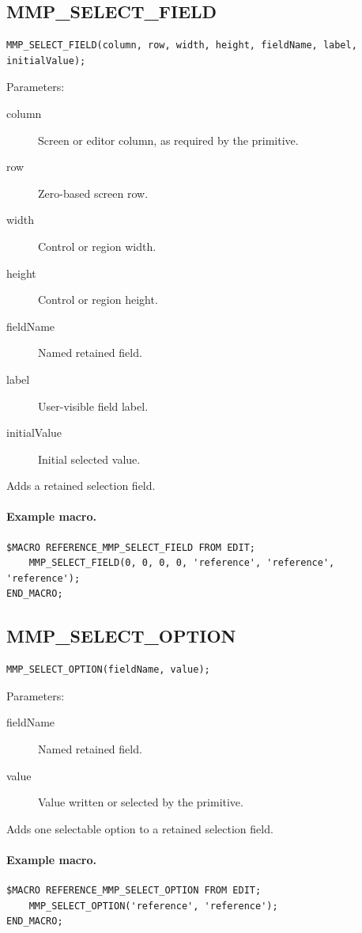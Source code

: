 \documentclass[a4paper,10pt,twoside,openany]{book}
\newenvironment{mrmacextension}{\begin{changebar}}{\end{changebar}}
\begin{document}
\begin{mrmacextension}
\label{prim:procedure-mmp-select-field}
\subsection*{MMP\_SELECT\_FIELD}
\begin{verbatim}
MMP_SELECT_FIELD(column, row, width, height, fieldName, label, initialValue);
\end{verbatim}
Parameters:
\begin{description}
\item[column] Screen or editor column, as required by the primitive.
\item[row] Zero-based screen row.
\item[width] Control or region width.
\item[height] Control or region height.
\item[fieldName] Named retained field.
\item[label] User-visible field label.
\item[initialValue] Initial selected value.
\end{description}

Adds a retained selection field.

\paragraph{Example macro.}
\begin{verbatim}
$MACRO REFERENCE_MMP_SELECT_FIELD FROM EDIT;
    MMP_SELECT_FIELD(0, 0, 0, 0, 'reference', 'reference', 'reference');
END_MACRO;
\end{verbatim}
\end{mrmacextension}

\begin{mrmacextension}
\label{prim:procedure-mmp-select-option}
\subsection*{MMP\_SELECT\_OPTION}
\begin{verbatim}
MMP_SELECT_OPTION(fieldName, value);
\end{verbatim}
Parameters:
\begin{description}
\item[fieldName] Named retained field.
\item[value] Value written or selected by the primitive.
\end{description}

Adds one selectable option to a retained selection field.

\paragraph{Example macro.}
\begin{verbatim}
$MACRO REFERENCE_MMP_SELECT_OPTION FROM EDIT;
    MMP_SELECT_OPTION('reference', 'reference');
END_MACRO;
\end{verbatim}
\end{mrmacextension}
\end{document}
